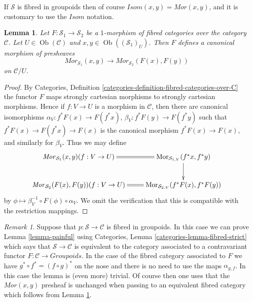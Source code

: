 \documentclass{stacks-project}
\theoremstyle{plain}
\newtheorem{lemma}[subsection]{Lemma}
\theoremstyle{definition}
\theoremstyle{remark}
\newtheorem{remark}[subsection]{Remark}
\numberwithin{equation}{subsection}
\def\Mor{\mathop{\mathrm{Mor}}\nolimits}
\def\Ob{\mathop{\mathrm{Ob}}\nolimits}
\begin{document}
\noindent
If $\mathcal{S}$ is fibred in groupoids then of course
$\mathit{Isom}(x, y) = \mathit{Mor}(x, y)$, and it is
customary to use the $\mathit{Isom}$ notation.

\begin{lemma}
\label{lemma-presheaf-mor-map-fibred-categories}
Let $F : \mathcal{S}_1 \to \mathcal{S}_2$ be a $1$-morphism of fibred
categories over the category $\mathcal{C}$. Let $U \in \Ob(\mathcal{C})$
and $x, y\in \Ob((\mathcal{S}_1)_U)$. Then $F$ defines a canonical
morphism of presheaves
$$
\mathit{Mor}_{\mathcal{S}_1}(x, y)
\longrightarrow
\mathit{Mor}_{\mathcal{S}_2}(F(x), F(y))
$$
on $\mathcal{C}/U$.
\end{lemma}

\begin{proof}
By
Categories, Definition \ref{categories-definition-fibred-categories-over-C}
the functor $F$ maps strongly cartesian morphisms to strongly cartesian
morphisms. Hence if $f : V \to U$ is a morphism in $\mathcal{C}$, then
there are canonical isomorphisms $\alpha_V : f^*F(x) \to F(f^*x)$,
$\beta_V : f^*F(y) \to F(f^*y)$ such that $f^*F(x) \to F(f^*x) \to F(x)$
is the canonical morphism $f^*F(x) \to F(x)$, and similarly for $\beta_V$.
Thus we may define
$$
\xymatrix{
\mathit{Mor}_{\mathcal{S}_1}(x, y)(f : V \to U) \ar@{=}[r] &
\Mor_{\mathcal{S}_{1, V}}(f^\ast x, f^\ast y) \ar[d] \\
\mathit{Mor}_{\mathcal{S}_2}(F(x), F(y))(f : V \to U) \ar@{=}[r] &
\Mor_{\mathcal{S}_{2, V}}(f^\ast F(x), f^\ast F(y))
}
$$
by $\phi \mapsto \beta_V^{-1} \circ F(\phi) \circ \alpha_V$.
We omit the verification that this is compatible with the restriction
mappings.
\end{proof}

\begin{remark}
\label{remark-alternative}
Suppose that $p : \mathcal{S} \to \mathcal{C}$ is fibred in groupoids.
In this case we can prove
Lemma \ref{lemma-painful}
using
Categories, Lemma \ref{categories-lemma-fibred-strict}
which says that $\mathcal{S} \to \mathcal{C}$ is equivalent to the
category associated to a contravariant functor
$F : \mathcal{C} \to \textit{Groupoids}$.
In the case of the fibred category associated to $F$
we have $g^* \circ f^* = (f \circ g)^*$ on the nose
and there is no need to use the maps $\alpha_{g, f}$.
In this case the lemma is (even more) trivial. Of course then
one uses that the $\mathit{Mor}(x, y)$ presheaf is
unchanged when passing to an equivalent fibred category which follows from
Lemma \ref{lemma-presheaf-mor-map-fibred-categories}.
\end{remark}
\end{document}
